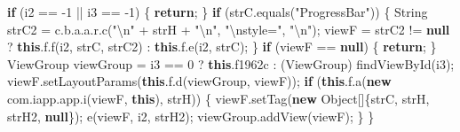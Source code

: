 \documentclass[
]{article}
\newenvironment{Shaded}{}{}
\newcommand{\BuiltInTok}[1]{\textcolor[rgb]{0.00,0.50,0.00}{#1}}
\newcommand{\ControlFlowTok}[1]{\textcolor[rgb]{0.00,0.44,0.13}{\textbf{#1}}}
\newcommand{\DecValTok}[1]{\textcolor[rgb]{0.25,0.63,0.44}{#1}}
\newcommand{\FunctionTok}[1]{\textcolor[rgb]{0.02,0.16,0.49}{#1}}
\newcommand{\KeywordTok}[1]{\textcolor[rgb]{0.00,0.44,0.13}{\textbf{#1}}}
\newcommand{\NormalTok}[1]{#1}
\newcommand{\OperatorTok}[1]{\textcolor[rgb]{0.40,0.40,0.40}{#1}}
\newcommand{\SpecialCharTok}[1]{\textcolor[rgb]{0.25,0.44,0.63}{#1}}
\newcommand{\StringTok}[1]{\textcolor[rgb]{0.25,0.44,0.63}{#1}}
\begin{document}
\begin{Shaded}
\begin{Highlighting}[]
        \ControlFlowTok{if} \OperatorTok{(}\NormalTok{i2 }\OperatorTok{==} \OperatorTok{{-}}\DecValTok{1} \OperatorTok{||}\NormalTok{ i3 }\OperatorTok{==} \OperatorTok{{-}}\DecValTok{1}\OperatorTok{)} \OperatorTok{\{}
            \ControlFlowTok{return}\OperatorTok{;}
        \OperatorTok{\}}
        \ControlFlowTok{if} \OperatorTok{(}\NormalTok{strC}\OperatorTok{.}\FunctionTok{equals}\OperatorTok{(}\StringTok{"ProgressBar"}\OperatorTok{))} \OperatorTok{\{}
            \BuiltInTok{String}\NormalTok{ strC2 }\OperatorTok{=}\NormalTok{ c}\OperatorTok{.}\FunctionTok{b}\OperatorTok{.}\FunctionTok{a}\OperatorTok{.}\FunctionTok{a}\OperatorTok{.}\FunctionTok{r}\OperatorTok{.}\FunctionTok{c}\OperatorTok{(}\StringTok{"}\SpecialCharTok{\textbackslash{}n}\StringTok{"} \OperatorTok{+}\NormalTok{ strH }\OperatorTok{+} \StringTok{"}\SpecialCharTok{\textbackslash{}n}\StringTok{"}\OperatorTok{,} \StringTok{"}\SpecialCharTok{\textbackslash{}n}\StringTok{style="}\OperatorTok{,} \StringTok{"}\SpecialCharTok{\textbackslash{}n}\StringTok{"}\OperatorTok{);}
\NormalTok{            viewF }\OperatorTok{=}\NormalTok{ strC2 }\OperatorTok{!=} \KeywordTok{null} \OperatorTok{?} \KeywordTok{this}\OperatorTok{.}\FunctionTok{f}\OperatorTok{.}\FunctionTok{f}\OperatorTok{(}\NormalTok{i2}\OperatorTok{,}\NormalTok{ strC}\OperatorTok{,}\NormalTok{ strC2}\OperatorTok{)} \OperatorTok{:} \KeywordTok{this}\OperatorTok{.}\FunctionTok{f}\OperatorTok{.}\FunctionTok{e}\OperatorTok{(}\NormalTok{i2}\OperatorTok{,}\NormalTok{ strC}\OperatorTok{);}
        \OperatorTok{\}}
        \ControlFlowTok{if} \OperatorTok{(}\NormalTok{viewF }\OperatorTok{==} \KeywordTok{null}\OperatorTok{)} \OperatorTok{\{}
            \ControlFlowTok{return}\OperatorTok{;}
        \OperatorTok{\}}
\NormalTok{        ViewGroup viewGroup }\OperatorTok{=}\NormalTok{ i3 }\OperatorTok{==} \DecValTok{0} \OperatorTok{?} \KeywordTok{this}\OperatorTok{.}\FunctionTok{f1962c} \OperatorTok{:} \OperatorTok{(}\NormalTok{ViewGroup}\OperatorTok{)} \FunctionTok{findViewById}\OperatorTok{(}\NormalTok{i3}\OperatorTok{);}
\NormalTok{        viewF}\OperatorTok{.}\FunctionTok{setLayoutParams}\OperatorTok{(}\KeywordTok{this}\OperatorTok{.}\FunctionTok{f}\OperatorTok{.}\FunctionTok{d}\OperatorTok{(}\NormalTok{viewGroup}\OperatorTok{,}\NormalTok{ viewF}\OperatorTok{));}
        \ControlFlowTok{if} \OperatorTok{(}\KeywordTok{this}\OperatorTok{.}\FunctionTok{f}\OperatorTok{.}\FunctionTok{a}\OperatorTok{(}\KeywordTok{new}\NormalTok{ com}\OperatorTok{.}\FunctionTok{iapp}\OperatorTok{.}\FunctionTok{app}\OperatorTok{.}\FunctionTok{i}\OperatorTok{(}\NormalTok{viewF}\OperatorTok{,} \KeywordTok{this}\OperatorTok{),}\NormalTok{ strH}\OperatorTok{))} \OperatorTok{\{}
\NormalTok{            viewF}\OperatorTok{.}\FunctionTok{setTag}\OperatorTok{(}\KeywordTok{new} \BuiltInTok{Object}\OperatorTok{[]\{}\NormalTok{strC}\OperatorTok{,}\NormalTok{ strH}\OperatorTok{,}\NormalTok{ strH2}\OperatorTok{,} \KeywordTok{null}\OperatorTok{\});}
            \FunctionTok{e}\OperatorTok{(}\NormalTok{viewF}\OperatorTok{,}\NormalTok{ i2}\OperatorTok{,}\NormalTok{ strH2}\OperatorTok{);}
\NormalTok{            viewGroup}\OperatorTok{.}\FunctionTok{addView}\OperatorTok{(}\NormalTok{viewF}\OperatorTok{);}
        \OperatorTok{\}}
    \OperatorTok{\}}


\end{Highlighting}
\end{Shaded}
\end{document}
